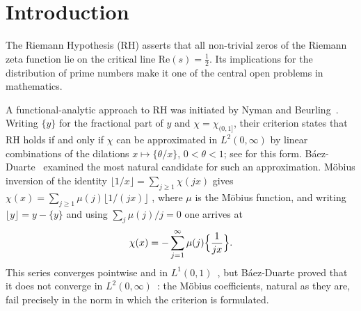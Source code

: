 \documentclass[11pt]{extarticle}
\numberwithin{equation}{section}
\theoremstyle{plain}
\theoremstyle{remark}
\begin{document}
\section{Introduction}\label{sec:intro}

The Riemann Hypothesis (RH) asserts that all non-trivial zeros of the Riemann
zeta function lie on the critical line $\mathrm{Re}(s) = \frac{1}{2}$. Its
implications for the distribution of prime numbers make it one of the central
open problems in mathematics.

A functional-analytic approach to RH was initiated by Nyman and
Beurling~\cite{beurling,Nyman}. Writing $\{y\}$ for the fractional part of $y$
and $\chi = \chi_{(0,1]}$, their criterion states that RH holds if and only if
$\chi$ can be approximated in $L^2(0,\infty)$ by linear combinations of the
dilations $x \mapsto \{\theta/x\}$, $0 < \theta < 1$; see
\cite[Theorem~1.1 and Remark~1.1]{baez-unitary} for this form.
Báez-Duarte~\cite{baez-beurling,baez-unitary} examined the most natural candidate
for such an approximation. M\"obius inversion of the identity
$\lfloor 1/x \rfloor = \sum_{j \geq 1} \chi(jx)$ \cite[(2.4)]{baez-unitary} gives
$\chi(x) = \sum_{j \geq 1} \mu(j) \lfloor 1/(jx) \rfloor$
\cite[(2.6)]{baez-unitary}, where $\mu$ is the
M\"obius function, and writing $\lfloor y \rfloor = y - \{y\}$ and using
$\sum_{j} \mu(j)/j = 0$ one arrives at
\begin{equation}\label{eq:bd-series}
\chi(x) = -\sum_{j=1}^{\infty} \mu(j) \Bigl\{ \frac{1}{jx} \Bigr\}.
\end{equation}
This series converges pointwise and in $L^1(0,1)$~\cite[\S2.2]{baez-unitary}, but
Báez-Duarte proved that it
does not converge in $L^2(0,\infty)$~\cite[Theorem~2.2]{baez-unitary}: the
M\"obius coefficients, natural as they are, fail precisely in the norm in which
the criterion is formulated.
\end{document}

